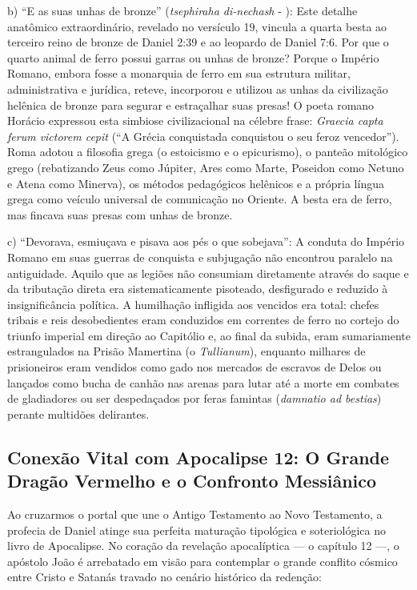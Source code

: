 \documentclass[11pt,a4paper,openany]{book}
\begin{document}
b) ``E as suas unhas de bronze'' (\textit{tsephiraha di-nechash} - ): Este detalhe anatômico extraordinário, revelado no versículo 19, vincula a quarta besta ao terceiro reino de bronze de Daniel 2:39 e ao leopardo de Daniel 7:6. Por que o quarto animal de ferro possui garras ou unhas de bronze? Porque o Império Romano, embora fosse a monarquia de ferro em sua estrutura militar, administrativa e jurídica, reteve, incorporou e utilizou as unhas da civilização helênica de bronze para segurar e estraçalhar suas presas! O poeta romano Horácio expressou esta simbiose civilizacional na célebre frase: \textit{Graecia capta ferum victorem cepit} (``A Grécia conquistada conquistou o seu feroz vencedor''). Roma adotou a filosofia grega (o estoicismo e o epicurismo), o panteão mitológico grego (rebatizando Zeus como Júpiter, Ares como Marte, Poseidon como Netuno e Atena como Minerva), os métodos pedagógicos helênicos e a própria língua grega como veículo universal de comunicação no Oriente. A besta era de ferro, mas fincava suas presas com unhas de bronze.

c) ``Devorava, esmiuçava e pisava aos pés o que sobejava'': A conduta do Império Romano em suas guerras de conquista e subjugação não encontrou paralelo na antiguidade. Aquilo que as legiões não consumiam diretamente através do saque e da tributação direta era sistematicamente pisoteado, desfigurado e reduzido à insignificância política. A humilhação infligida aos vencidos era total: chefes tribais e reis desobedientes eram conduzidos em correntes de ferro no cortejo do triunfo imperial em direção ao Capitólio e, ao final da subida, eram sumariamente estrangulados na Prisão Mamertina (o \textit{Tullianum}), enquanto milhares de prisioneiros eram vendidos como gado nos mercados de escravos de Delos ou lançados como bucha de canhão nas arenas para lutar até a morte em combates de gladiadores ou ser despedaçados por feras famintas (\textit{damnatio ad bestias}) perante multidões delirantes.


\subsection{Conexão Vital com Apocalipse 12: O Grande Dragão Vermelho e o Confronto Messiânico}


Ao cruzarmos o portal que une o Antigo Testamento ao Novo Testamento, a profecia de Daniel atinge sua perfeita maturação tipológica e soteriológica no livro de Apocalipse. No coração da revelação apocalíptica — o capítulo 12 —, o apóstolo João é arrebatado em visão para contemplar o grande conflito cósmico entre Cristo e Satanás travado no cenário histórico da redenção:
\end{document}
